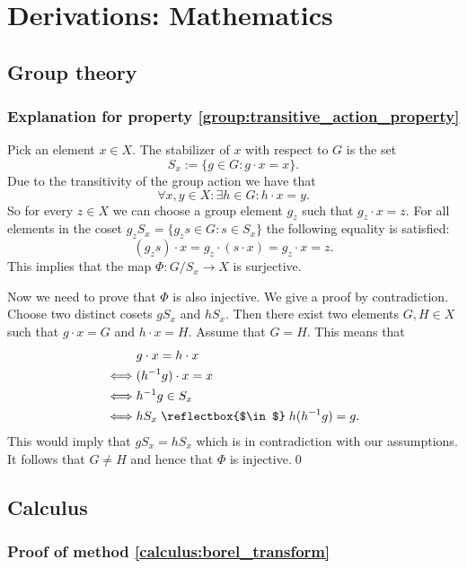 \chapter{Derivations: Mathematics}

\section{Group theory}
\subsection{Explanation for property \ref{group:transitive_action_property}}\label{proof:stabilizer}

    Pick an element $x\in X$. The stabilizer of $x$ with respect to $G$ is the set \[S_x := \{g\in G:g\cdot x = x\}.\]
    Due to the transitivity of the group action we have that \[\forall x, y\in X: \exists h\in G: h\cdot x = y.\] So for every $z\in X$ we can choose a group element $g_z$ such that $g_z\cdot x = z$. For all elements in the coset $g_zS_x = \{g_zs\in G:s\in S_x\}$ the following equality is satisfied: \[(g_zs)\cdot x = g_z\cdot (s\cdot x) = g_z\cdot x = z.\] This implies that the map $\Phi:G/S_x \rightarrow X$ is surjective.

    Now we need to prove that $\Phi$ is also injective. We give a proof by contradiction. Choose two distinct cosets $gS_x$ and $hS_x$. Then there exist two elements $G, H\in X$ such that $g\cdot x = G$ and $h\cdot x = H$. Assume that $G = H$. This means that
    \begin{align*}
        &g\cdot x = h\cdot x\\
        \iff&(h^{-1}g)\cdot x = x\\
        \iff&h^{-1}g\in S_x\\
        \iff&hS_x\mathrel{\reflectbox{$\in$}}h(h^{-1}g) = g.
    \end{align*}
    This would imply that $gS_x = hS_x$ which is in contradiction with our assumptions. It follows that $G\neq H$ and hence that $\Phi$ is injective.\qed

\section{Calculus}
\subsection{Proof of method \ref{calculus:borel_transform}}

